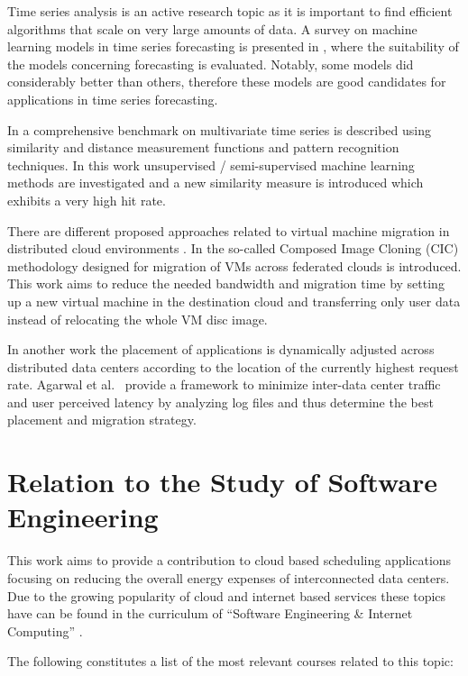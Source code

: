 \documentclass[a4paper]{article}
\begin{document}
Time series analysis is an active research topic as it is important to find efficient algorithms that scale on very large amounts of data. A survey on machine learning models in time series forecasting is presented in \cite{ahmed2010empirical}, where the suitability of the models concerning forecasting is evaluated. Notably, some models did considerably better than others, therefore these models are good candidates for applications in time series forecasting. 

In \cite{lin2011pattern} a comprehensive benchmark on multivariate time series is described using similarity and distance measurement functions and pattern recognition techniques. In this work unsupervised / semi-supervised machine learning methods are investigated and a new similarity measure is introduced which exhibits a very high hit rate. 

There are different proposed approaches related to virtual machine migration in distributed cloud environments \cite{celesti2010improving, malet2010resource}. In \cite{celesti2010improving} the so-called Composed Image Cloning (CIC) methodology designed for migration of VMs across federated clouds is introduced. This work aims to reduce the needed bandwidth and migration time by setting up a new virtual machine in the destination cloud and transferring only user data instead of relocating the whole VM disc image. 

In another work \cite{malet2010resource} the placement of applications is dynamically adjusted across distributed data centers according to the location of the currently highest request rate. Agarwal et al.~\cite{agarwal2010volley} provide a framework to minimize inter-data center traffic and user perceived latency by analyzing log files and thus determine the best placement and migration strategy. 


\section{Relation to the Study of Software Engineering}

This work aims to provide a contribution to cloud based scheduling applications focusing on reducing the overall energy expenses of interconnected data centers. Due to the growing popularity of cloud and internet based services these topics have can be found in the curriculum of ``Software Engineering \& Internet Computing'' \cite{curriculum2013curriculum}. 

The following constitutes a list of the most relevant courses related to this topic:
\end{document}

